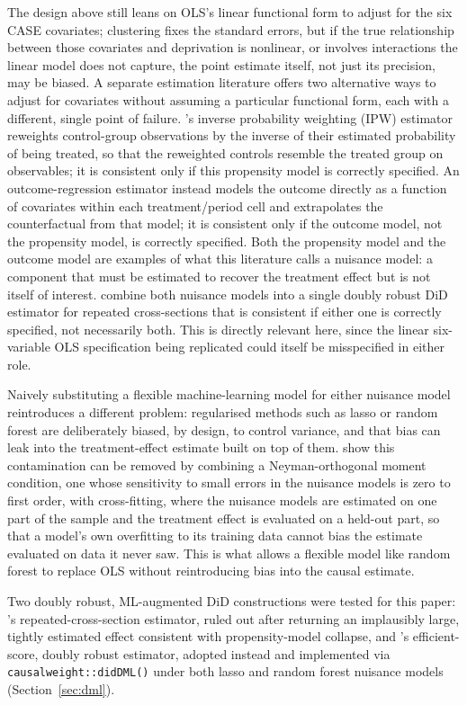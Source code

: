 The design above still leans on OLS's linear functional form to adjust for the six CASE covariates; clustering fixes the standard errors, but if the true relationship between those covariates and deprivation is nonlinear, or involves interactions the linear model does not capture, the point estimate itself, not just its precision, may be biased. A separate estimation literature offers two alternative ways to adjust for covariates without assuming a particular functional form, each with a different, single point of failure. \citet{abadie2005}'s inverse probability weighting (IPW) estimator reweights control-group observations by the inverse of their estimated probability of being treated, so that the reweighted controls resemble the treated group on observables; it is consistent only if this propensity model is correctly specified. An outcome-regression estimator instead models the outcome directly as a function of covariates within each treatment/period cell and extrapolates the counterfactual from that model; it is consistent only if the outcome model, not the propensity model, is correctly specified. Both the propensity model and the outcome model are examples of what this literature calls a nuisance model: a component that must be estimated to recover the treatment effect but is not itself of interest. \citet{santannazhao2020} combine both nuisance models into a single doubly robust DiD estimator for repeated cross-sections that is consistent if either one is correctly specified, not necessarily both. This is directly relevant here, since the linear six-variable OLS specification being replicated could itself be misspecified in either role.

Naively substituting a flexible machine-learning model for either nuisance model reintroduces a different problem: regularised methods such as lasso or random forest are deliberately biased, by design, to control variance, and that bias can leak into the treatment-effect estimate built on top of them. \citet{chernozhukov2018} show this contamination can be removed by combining a Neyman-orthogonal moment condition, one whose sensitivity to small errors in the nuisance models is zero to first order, with cross-fitting, where the nuisance models are estimated on one part of the sample and the treatment effect is evaluated on a held-out part, so that a model's own overfitting to its training data cannot bias the estimate evaluated on data it never saw. This is what allows a flexible model like random forest to replace OLS without reintroducing bias into the causal estimate.

Two doubly robust, ML-augmented DiD constructions were tested for this paper: \citet{chang2020}'s repeated-cross-section estimator, ruled out after returning an implausibly large, tightly estimated effect consistent with propensity-model collapse, and \citet{zimmert2020}'s efficient-score, doubly robust estimator, adopted instead and implemented via \texttt{causalweight::didDML()} under both lasso and random forest nuisance models (Section~\ref{sec:dml}).